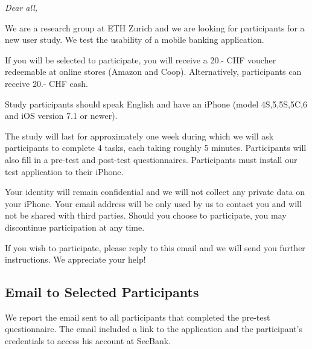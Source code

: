 {\itshape
Dear all,

We are a research group at ETH Zurich and we are looking for participants for a new user study. We test the usability of a mobile banking application.

If you will be selected to participate, you will receive a 20.- CHF voucher redeemable at online stores (Amazon and Coop). Alternatively, participants can receive 20.- CHF cash.

Study participants should speak English and have an iPhone (model 4S,5,5S,5C,6 and iOS version 7.1 or newer).

The study will last for approximately one week during which we will ask participants to complete 4 tasks, each taking roughly 5 minutes. Participants will also fill in a pre-test and post-test questionnaires. Participants must install our test application to their iPhone.

Your identity will remain confidential and we will not collect any private data on your iPhone.
Your email address will be only used by us to contact you and will not be shared with third parties.
Should you choose to participate, you may discontinue participation at any time.

If you wish to participate, please reply to this email and we will send you further instructions. We appreciate your help!}

\subsection{Email to Selected Participants}
\label{app:sp_phishing_selectedemail}
We report the email sent to all participants that completed the pre-test questionnaire.
The email included a link to the application and the participant's credentials to access his account at SecBank.

